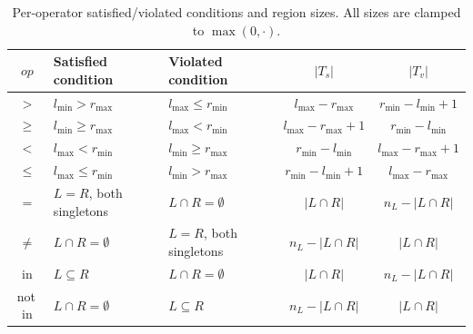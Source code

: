 \documentclass[pdflatex,sn-basic]{sn-jnl}%
\theoremstyle{thmstyleone}%
\theoremstyle{thmstyletwo}%
\theoremstyle{thmstylethree}%
\begin{document}
\begin{table}[t]
\centering
\caption{Per-operator satisfied/violated conditions and region sizes. All sizes are clamped to $\max(0, \cdot)$.}
\label{tab:op-formulas}
\small
\begin{tabular}{cllcc}
\toprule
$op$ & Satisfied condition & Violated condition & $|T_s|$ & $|T_v|$ \\
\midrule
$>$    & $l_{\min} > r_{\max}$    & $l_{\max} \leq r_{\min}$  & $l_{\max} - r_{\max}$     & $r_{\min} - l_{\min} + 1$ \\
$\geq$ & $l_{\min} \geq r_{\max}$ & $l_{\max} < r_{\min}$     & $l_{\max} - r_{\max} + 1$ & $r_{\min} - l_{\min}$     \\
$<$    & $l_{\max} < r_{\min}$    & $l_{\min} \geq r_{\max}$  & $r_{\min} - l_{\min}$     & $l_{\max} - r_{\max} + 1$ \\
$\leq$ & $l_{\max} \leq r_{\min}$ & $l_{\min} > r_{\max}$     & $r_{\min} - l_{\min} + 1$ & $l_{\max} - r_{\max}$     \\
\midrule
$=$    & $L = R$, both singletons  & $L \cap R = \emptyset$  & $|L \cap R|$ & $n_L - |L \cap R|$ \\
$\neq$ & $L \cap R = \emptyset$  & $L = R$, both singletons  & $n_L - |L \cap R|$ & $|L \cap R|$ \\
\midrule
in     & $L \subseteq R$ & $L \cap R = \emptyset$ & $|L \cap R|$       & $n_L - |L \cap R|$ \\
not\,in & $L \cap R = \emptyset$ & $L \subseteq R$ & $n_L - |L \cap R|$ & $|L \cap R|$       \\
\bottomrule
\end{tabular}
\end{table}
\end{document}
